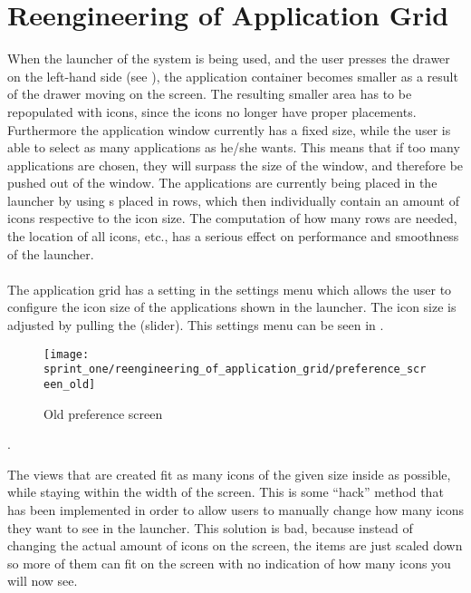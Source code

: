 
\section{Reengineering of Application Grid}
\label{sec:reengineering_of_application_grid}

When the launcher of the \giraf system is being used, and the user presses the drawer on the left-hand side (see ), the application container becomes smaller as a result of the drawer moving on the screen. The resulting smaller area has to be repopulated with icons, since the icons no longer have proper placements. Furthermore the application window currently has a fixed size, while the user is able to select as many applications as he/she wants. This means that if too many applications are chosen, they will surpass the size of the window, and therefore be pushed out of the window. The applications are currently being placed in the launcher by using s placed in rows, which then individually contain an amount of icons respective to the icon size. The computation of how many rows are needed, the location of all icons, etc., has a serious effect on performance and smoothness of the launcher. 
\\\\
The application grid has a setting in the settings menu which allows the user to configure the icon size of the applications shown in the launcher. The icon size is adjusted by pulling the  (slider). This settings menu can be seen in .

\begin{figure}[!htbp]
    \centering
    \texttt{[image: sprint\_one/reengineering\_of\_application\_grid/preference\_screen\_old]}
    \caption{Old preference screen}
    \label{fig:preference_screen_old}
\end{figure}.

The  views that are created fit as many icons of the given size inside as possible, while staying within the width of the screen. This is some ``hack'' method that has been implemented in order to allow users to manually change how many icons they want to see in the launcher. This solution is bad, because instead of changing the actual amount of icons on the screen, the items are just scaled down so more of them can fit on the screen with no indication of how many icons you will now see.


